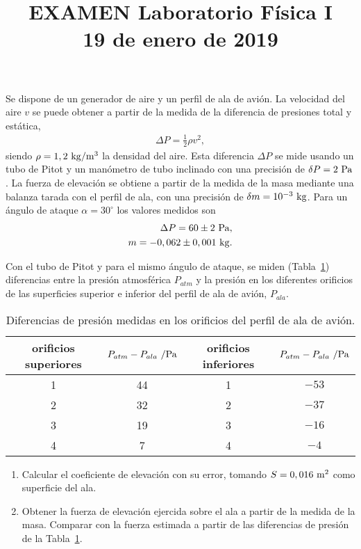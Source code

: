 \documentclass[12pt]{articulo}
\date{\vspace{-5ex}}
\begin{document}
\title{\bf EXAMEN Laboratorio F\'isica I\\19 de enero de 2019} 

\author{}

\maketitle

Se dispone de un generador de aire y un perfil de ala de avi\'on. La velocidad
del aire $v$ se puede obtener a partir de la medida de la diferencia de
presiones total y est\'atica,
%
\begin{eqnarray*}
\Delta P = \frac{1}{2}\rho v^2,
\end{eqnarray*}
%
siendo $\rho = 1,2~{\rm kg/m^3}$ la densidad del aire. Esta diferencia $\Delta P$
se mide usando un tubo de Pitot y un man\'ometro de tubo inclinado con una
precisi\'on de $\delta P = 2~{\rm Pa}$. La fuerza de elevaci\'on se obtiene a
partir de la medida de la masa mediante una balanza tarada con el perfil de ala,
con una precisi\'on de $\delta m = 10^{-3}~{\rm kg}$. Para un \'angulo de ataque
$\alpha = 30^{\circ}$ los valores medidos son
%
\begin{eqnarray*}
\Delta P = 60 \pm 2~{\rm Pa},\\
m = -0,062 \pm 0,001~{\rm kg}.
\end{eqnarray*}

Con el tubo de Pitot y para el mismo \'angulo de ataque, se miden
(Tabla~\ref{tab:presiones}) diferencias entre la presi\'on atmosf\'erica
$P_{atm}$ y la presi\'on en los diferentes orificios de las superficies superior
e inferior del perfil de ala de avi\'on, $P_{ala}$.
\begin{table}[h!]
\begin{center}
\begin{tabular}{cc|cc}
\hline
orificios superiores & $P_{atm} - P_{ala}~/{\rm Pa}$ & orificios inferiores & $P_{atm} - P_{ala}~/{\rm Pa}$\\
\hline
1 & 44 & 1 & $-53$\\
2 & 32 & 2 & $-37$\\
3 & 19 & 3 & $-16$\\
4 &  7 & 4 &  $-4$\\
\hline
\end{tabular}
\end{center}
\caption{Diferencias de presi\'on medidas en los orificios del perfil de ala de avi\'on.}
\label{tab:presiones}
\end{table}

\begin{enumerate}
\item{Calcular el coeficiente de elevaci\'on con su error, tomando $S = 0,016~{\rm m^2}$
como superficie del ala.}
\item{Obtener la fuerza de elevaci\'on ejercida sobre el ala a partir de la medida
de la masa. Comparar con la fuerza estimada a partir de las diferencias de presi\'on
de la Tabla~\ref{tab:presiones}.}
\end{enumerate}
\end{document}

